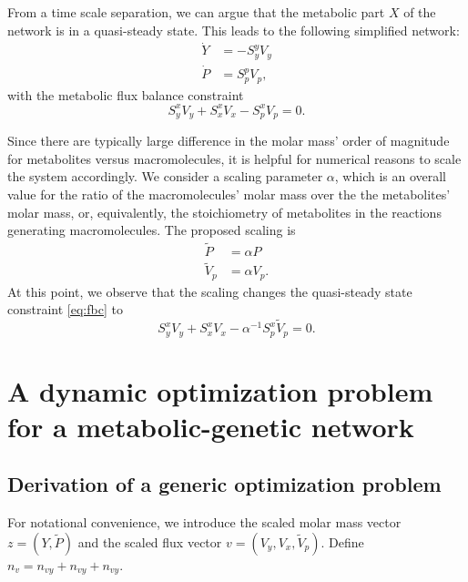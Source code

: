 \documentclass[a4paper,11pt,DIV12]{scrartcl}
\theoremstyle{remark}
\begin{document}
From a time scale separation, we can argue that the metabolic part $X$ of the network is in a quasi-steady state.
This leads to the following simplified network:
\begin{equation}
  \label{eq:reduced-metabolic-genetic-network}
  \begin{aligned}
    \dot Y &= - S^y_y V_y \\
    \dot P &= S^p_p V_p,
  \end{aligned}
\end{equation}
with the metabolic flux balance constraint
\begin{equation}
  \label{eq:fbc}
  S^x_y V_y + S^x_x V_x - S^x_p V_p = 0.
\end{equation}

Since there are typically large difference in the molar mass' order of magnitude for metabolites versus macromolecules, it is helpful for numerical reasons to scale the system accordingly.
We consider a scaling parameter $\alpha$, which is an overall value for the ratio of the macromolecules' molar mass over the the metabolites' molar mass, or, equivalently, the stoichiometry of metabolites in the reactions generating macromolecules.
The proposed scaling is
\begin{equation}
  \label{eq:scaling-with-alpha}
  \begin{aligned}
    \tilde P &= \alpha P \\
    \tilde V_p &= \alpha V_p.
  \end{aligned}
\end{equation}
At this point, we observe that the scaling changes the quasi-steady state constraint \eqref{eq:fbc} to
\begin{equation}
  \label{eq:fbc-scaled}
  S^x_y V_y + S^x_x V_x - \alpha^{-1} S^x_p \tilde V_p = 0.
\end{equation}

\section{A dynamic optimization problem for a metabolic-genetic network}
\label{sec:dynam-optim-probl}

\subsection{Derivation of a generic optimization problem}
\label{sec:deriv-gener-optim}

For notational convenience, we introduce the scaled molar mass vector $z = (Y, \tilde P)$ and the scaled flux vector $v = (V_y, V_x, \tilde V_p)$.
Define $n_v = n_{vy} + n_{vy} + n_{vy}$.
\end{document}
